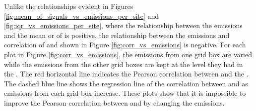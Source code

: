 \newpage
\begin{flushleft}
     
     Unlike the relationships evident in Figures \ref{fig:mean_of_signals_vs_emissions_per_site} and \ref{fig:iqr_vs_emissions_per_site}, where the relationship between the emissions and the mean or \iq of \modelc is positive, the relationship between the emissions and correlation of \modelc and \obsC shown in Figure \ref{fig:corr_vs_emissions} is negative.  For each plot in Figure \ref{fig:corr_vs_emissions}, the emissions from one grid box are varied while the emissions from the other grid boxes are kept at the level they had in the \on. The red horizontal line indicates the Pearson correlation between \obsC and the \on. The dashed blue line shows the regression line of the correlation between \modelc and \obsC as emissions from each grid box increase. These plots show that it is impossible to improve the Pearson correlation between \modelc and \obsC by changing the emissions.
     
     

\end{flushleft}


